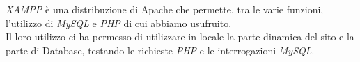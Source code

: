 \emph{XAMPP} è una distribuzione di Apache che permette, tra le varie funzioni, l'utilizzo di \emph{MySQL} e \emph{PHP} di cui abbiamo usufruito.\\
Il loro utilizzo ci ha permesso di utilizzare in locale la parte dinamica del sito e la parte di Database, testando le richieste \emph{PHP} e le interrogazioni \emph{MySQL}.